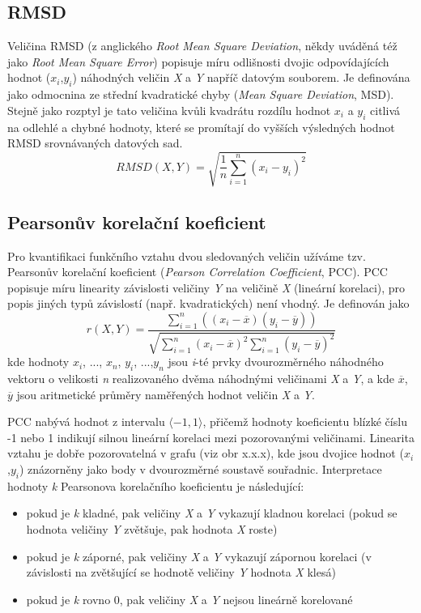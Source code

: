 \subsection{RMSD}
Veličina RMSD (z anglického \textit{Root Mean Square Deviation}, někdy uváděná též jako \textit{Root Mean Square Error}) popisuje míru odlišnosti dvojic odpovídajících hodnot ($x_i$,$y_i$) náhodných veličin \textit{X} a \textit{Y} napříč datovým souborem. Je definována jako odmocnina ze střední kvadratické chyby (\textit{Mean Square Deviation}, MSD). Stejně jako rozptyl je tato veličina kvůli kvadrátu rozdílu hodnot $x_i$ a $y_i$ citlivá na odlehlé a chybné hodnoty, které se promítají do vyšších výsledných hodnot RMSD srovnávaných datových sad. 
\begin{equation}
    RMSD(X,Y) = \sqrt{\frac{1}{n} \sum_{i=1}^n (x_i - y_i)^2} 
\end{equation}
\subsection{Pearsonův korelační koeficient}
Pro kvantifikaci funkčního vztahu dvou sledovaných veličin užíváme tzv. Pearsonův korelační koeficient (\textit{Pearson Correlation Coefficient}, PCC). PCC popisuje míru linearity závislosti veličiny \textit{Y} na veličině \textit{X} (lineární korelaci), pro popis jiných typů závislostí (např. kvadratických) není vhodný. Je definován jako
\begin{equation}
\label{pearson}
    r(X,Y) = \frac
    {\sum_{i=1}^n ((x_i - \overline{x})(y_i - \overline{y}))}
    {\sqrt{\sum_{i=1}^n (x_i - \overline{x})^2 \sum_{i=1}^n (y_i - \overline{y})^2}}
\end{equation}
kde hodnoty $x_i$, ..., $x_n$, $y_i$, ...,$y_n$ jsou \textit{i}-té prvky dvourozměrného náhodného vektoru o velikosti \textit{n} realizovaného dvěma náhodnými veličinami \textit{X} a \textit{Y}, a kde $\overline{x}$, $\overline{y}$ jsou aritmetické průměry naměřených hodnot veličin \textit{X} a \textit{Y}. 

PCC nabývá hodnot z intervalu $\langle-1, 1 \rangle$, přičemž hodnoty koeficientu blízké číslu -1 nebo 1 indikují silnou lineární korelaci mezi pozorovanými veličinami. Linearita vztahu je dobře pozorovatelná v grafu (viz obr x.x.x), kde jsou dvojice hodnot ($x_i$,$y_i$) znázorněny jako body v dvourozměrné soustavě souřadnic. Interpretace hodnoty \textit{k} Pearsonova korelačního koeficientu je následující: 
\begin{itemize}
    \item pokud je \textit{k} kladné, pak veličiny \textit{X} a \textit{Y} vykazují kladnou korelaci (pokud se hodnota veličiny \textit{Y} zvětšuje, pak hodnota\textit{ X} roste)
    \item pokud je \textit{k} záporné, pak veličiny \textit{X} a \textit{Y} vykazují zápornou korelaci (v závislosti na zvětšující se hodnotě veličiny \textit{Y} hodnota \textit{X} klesá)
    \item pokud je \textit{k} rovno 0, pak veličiny \textit{X} a \textit{Y} nejsou lineárně korelované
\end{itemize}


